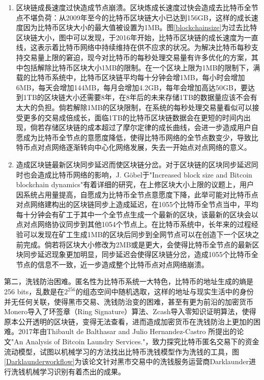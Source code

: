 					\begin{enumerate}
						\item 区块链成⾧速度过快造成节点崩溃。区块炼成长速度过快会造成去比特币全节点不堪负荷：从2009年至今的比特币区块链大小已达到156GB，这样的成长速度因为比特币区块大小的最大值被设置为1MB。图\ref{blockchainsize}为过去比特区块链大小，图中可以发现，于2016年开始，比特币区块链的成长速度为一直线，这表示着比特币网络中持续维持在供不应求的状况。为解决比特币每秒⽀持交易量上限的窘迫，现今对⽐特币的每秒处理交易量有许多优化的⽅案，其中包括解除比特币区块大小1MB的限制。在一个区块上限为1MB的限制下，满载的比特币系统中，比特币区块链平均每十分钟会增1MB，每小时会增加6MB，每天会增加144MB，每月会增加4.2GB，每年会增加高达50GB，要达到1TB的区块链大小还需要8年，在8年后的未来存储1TB的数据量应该不会有太大的负担。倘若解除1MB的区块限制，在系统的每秒处理交易量看似可以接受更多的交易成倍成长，面临1TB的比特币区块链数据会在更短的时间内出现，倘若存储区块链的成本超过了摩尔定律的成长曲线，会进一步造成用户自愿成为比特币全节点的意愿度降低，使得比特币网络的全节点数变少，导致比特币点对点网络逐渐转向中心化网络发展，失去一开始点对点网络的意义。

						\item 造成区块链最新区块同步延迟而使区块链分岔。对于区块链的区块同步延迟同时也会造成比特币网络的影响，J. Göbel于"Increased block size and Bitcoin blockchain dynamics"\supercite{TelecommunicationNetworksandApplicationsConferenceITNAC201727thInternational}有着详细的研究，在上修区块大小上限的议题上，用户因系统占用量提高，⾃愿成为⽐特币全节点意愿度下降，此举可能对⽐特币点对点网络建构出的区块链同步上造成延迟，在1055个比特币全节点当中，平均每十分钟会有矿工于其中一个全节点生成一个最新的区块，该最新的区块会以点对点网络协议同步到其他1054个节点上。在比特币系统中，长年来的过程经验可以发现在矿工生成1MB的区块后同步到全网节点可以在创造下一个区块之前完成。倘若将区块大小修改为2MB或是更大，会使得比特币全节点的最新区块同步延迟现象更加明显，同步延迟会使得区块链分岔，造成1055个比特币全节点的信息不一致，近一步造成整个比特币点对点网络崩溃。
					\end{enumerate}
					

				第二，洗钱防治困难。匿名性为比特币系统一大特色，比特币的地址生成的熵是256 bits，乱数是在$2^{256}$的组态空间中随机选取，这样的地址与现实生活中的身份并无任何关联，使得黑市交易、洗钱防治变的困难，甚至有更为前沿的加密货币Monero\supercite{noether2014monero}导入了环签章（Ring Signature）\supercite{Thresholdringsignaturesandapplicationstoad-hocgroups}算法、Zcash\supercite{zhong2002faster}导入零知识证明算法\supercite{Zero-KnowledgeProofsofIdentity}，使得原本公开透明的区块链，变得无法查看，进而造成加密货币在洗钱防治上更加的困难。2017年由Thibault de Balthasar and Julio Hernandez-Castro 所提出的论文"An Analysis of Bitcoin Laundry Services."\supercite{AnAnalysisofBitcoinLaundryServices}，致⼒探究⽐特币匿名交易下的资⾦流动模型，试图以机械学习的方法找出比特币洗钱模型作为洗钱的工具，图\ref{Darklaunderworkflow}为该论文针对黑市交易中的洗钱服务运营商Darklaunder进行洗钱机械学习识别有着杰出的成果。

